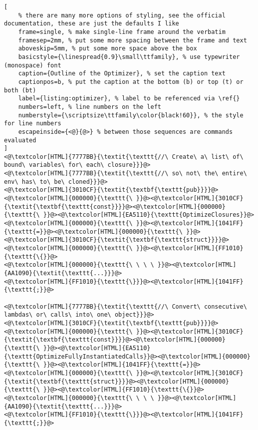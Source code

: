 \begin{lstlisting}[
	% there are many more options of styling, see the official documentation, these are just the defaults I like
	frame=single, % make single-line frame around the verbatim
	framesep=2mm, % put some more spacing between the frame and text
	aboveskip=5mm, % put some more space above the box
	basicstyle={\linespread{0.9}\small\ttfamily}, % use typewriter (monospace) font
	caption={Outline of the Optimizer}, % set the caption text
	captionpos=b, % put the caption at the bottom (b) or top (t) or both (bt)
    label={listing:optimizer}, % label to be referenced via \ref{}
	numbers=left, % line numbers on the left
	numberstyle={\scriptsize\ttfamily\color{black!60}}, % the style for line numbers
	escapeinside={<@}{@>} % between those sequences are commands evaluated
]
<@\textcolor[HTML]{7777BB}{\textit{\texttt{//\ Create\ a\ list\ of\ bound\ variables\ for\ each\ closure}}}@>
<@\textcolor[HTML]{7777BB}{\textit{\texttt{//\ so\ not\ the\ entire\ env\ has\ to\ be\ cloned}}}@>
<@\textcolor[HTML]{3010CF}{\textit{\textbf{\texttt{pub}}}}@><@\textcolor[HTML]{000000}{\texttt{\ }}@><@\textcolor[HTML]{3010CF}{\textit{\textbf{\texttt{const}}}}@><@\textcolor[HTML]{000000}{\texttt{\ }}@><@\textcolor[HTML]{EA5110}{\texttt{OptimizeClosures}}@><@\textcolor[HTML]{000000}{\texttt{\ }}@><@\textcolor[HTML]{1041FF}{\texttt{=}}@><@\textcolor[HTML]{000000}{\texttt{\ }}@><@\textcolor[HTML]{3010CF}{\textit{\textbf{\texttt{struct}}}}@><@\textcolor[HTML]{000000}{\texttt{\ }}@><@\textcolor[HTML]{FF1010}{\texttt{\{}}@>
<@\textcolor[HTML]{000000}{\texttt{\ \ \ \ }}@><@\textcolor[HTML]{AA1090}{\textit{\texttt{...}}}@>
<@\textcolor[HTML]{FF1010}{\texttt{\}}}@><@\textcolor[HTML]{1041FF}{\texttt{;}}@>

<@\textcolor[HTML]{7777BB}{\textit{\texttt{//\ Convert\ consecutive\ lambdas\ or\ calls\ into\ one\ object}}}@>
<@\textcolor[HTML]{3010CF}{\textit{\textbf{\texttt{pub}}}}@><@\textcolor[HTML]{000000}{\texttt{\ }}@><@\textcolor[HTML]{3010CF}{\textit{\textbf{\texttt{const}}}}@><@\textcolor[HTML]{000000}{\texttt{\ }}@><@\textcolor[HTML]{EA5110}{\texttt{OptimizeFullyInstantiatedCalls}}@><@\textcolor[HTML]{000000}{\texttt{\ }}@><@\textcolor[HTML]{1041FF}{\texttt{=}}@><@\textcolor[HTML]{000000}{\texttt{\ }}@><@\textcolor[HTML]{3010CF}{\textit{\textbf{\texttt{struct}}}}@><@\textcolor[HTML]{000000}{\texttt{\ }}@><@\textcolor[HTML]{FF1010}{\texttt{\{}}@>
<@\textcolor[HTML]{000000}{\texttt{\ \ \ \ }}@><@\textcolor[HTML]{AA1090}{\textit{\texttt{...}}}@>
<@\textcolor[HTML]{FF1010}{\texttt{\}}}@><@\textcolor[HTML]{1041FF}{\texttt{;}}@>


\end{lstlisting}
